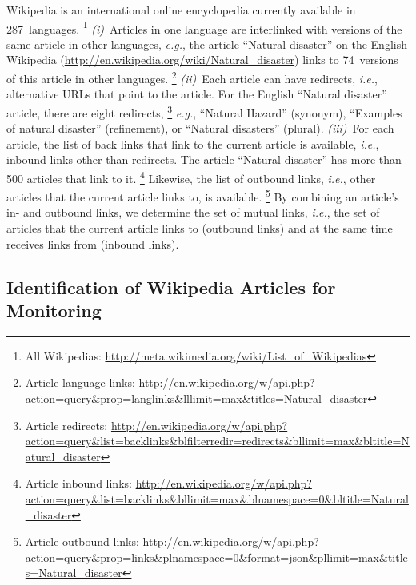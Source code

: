\documentclass[letterpaper]{article}
\begin{document}
Wikipedia is an international online encyclopedia
currently available in 287~languages.%
\footnote{All Wikipedias: \url{http://meta.wikimedia.org/wiki/List_of_Wikipedias}}
\emph{(i)}~Articles in one language are interlinked with versions of the same article
in other languages, \emph{e.g.}, the article ``Natural disaster''
on the English Wikipedia
(\url{http://en.wikipedia.org/wiki/Natural_disaster}) \linebreak
links to 74~versions of this article in other languages.%
\footnote{Article language links:
\url{http://en.wikipedia.org/w/api.php?action=query&prop=langlinks&lllimit=max&titles=Natural_disaster}}
\emph{(ii)}~Each article can have redirects, \emph{i.e.}, alternative URLs
that point to the article.
For the English ``Natural disaster'' article, there are eight redirects,%
\footnote{Article redirects:
\url{http://en.wikipedia.org/w/api.php?action=query&list=backlinks&blfilterredir=redirects&bllimit=max&bltitle=Natural_disaster}}
\emph{e.g.}, ``Natural Hazard'' (synonym),
``Examples of natural disaster'' (refinement), or
``Natural disasters'' (plural).
\emph{(iii)}~For each article, the list of back links
that link to the current article is available, \emph{i.e.},
inbound links other than redirects.
The article ``Natural disaster'' has more than 500 articles that link to it.%
\footnote{Article inbound links: \url{http://en.wikipedia.org/w/api.php?action=query&list=backlinks&bllimit=max&blnamespace=0&bltitle=Natural_disaster}}
Likewise, the list of outbound links, \emph{i.e.}, other articles
that the current article links to, is available.%
\footnote{Article outbound links: \url{http://en.wikipedia.org/w/api.php?action=query&prop=links&plnamespace=0&format=json&pllimit=max&titles=Natural_disaster}}
By combining an article's in- and outbound links,
we determine the set of mutual links,
\emph{i.e.}, the set of articles that the current article links to (outbound links)
and at the same time receives links from (inbound links).

\subsection{Identification of Wikipedia Articles for Monitoring}
\label{sec:identification-of-monitoring}
\end{document}
